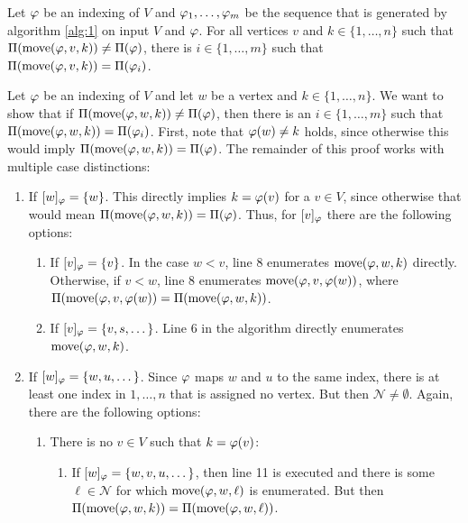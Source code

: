 \begin{lemmarep}[Completeness]
    Let $\varphi$ be an indexing of $V$ and $\varphi_1,\dots,\varphi_m$ be the sequence that is generated by algorithm \ref{alg:1} on input $V$ and $\varphi$. For all vertices $v$ and $k \in \{1,\dots,n\}$ such that $\Pi(\mathrm{move}(\varphi,v,k)) \neq \Pi(\varphi)$, there is $i\in \{1,\dots,m\}$ such that $\Pi(\mathrm{move}(\varphi,v,k)) = \Pi(\varphi_i)$.\label{lemma:completeness}
\end{lemmarep}
\begin{appendixproof}
    Let $\varphi$ be an indexing of $V$ and let $w$ be a vertex and $k\in\{1,\dots,n\}$. We want to show that if $\Pi(\mathrm{move}(\varphi,w,k)) \neq \Pi(\varphi)$, then there is an $i\in \{1,\dots,m\}$ such that $\Pi(\mathrm{move}(\varphi,w,k)) = \Pi(\varphi_i)$. First, note that $\varphi(w)\neq k$ holds, since otherwise this would imply $\Pi(\mathrm{move}(\varphi,w,k)) = \Pi(\varphi)$. The remainder of this proof works with multiple case distinctions:
    \begin{enumerate}
        \item If $[w]_\varphi = \{ w \}$. This directly implies $k = \varphi(v)$ for a $v \in V$, since otherwise that would mean $\Pi(\mathrm{move}(\varphi,w,k)) = \Pi(\varphi)$. Thus, for $[v]_\varphi$ there are the following options:
        \begin{enumerate}
            \item If $[v]_\varphi = \{ v \}$. In the case $w < v$, line 8 enumerates $\mathrm{move}(\varphi,w,k)$ directly.  Otherwise, if $v < w$, line 8 enumerates $\mathrm{move}(\varphi,v,\varphi(w))$, where $\Pi(\mathrm{move}(\varphi,v,\varphi(w)) = \Pi(\mathrm{move}(\varphi,w,k))$. 
            \item If $[v]_\varphi = \{ v,s,\dots \}$. Line 6 in the algorithm directly enumerates $\mathrm{move}(\varphi,w,k)$.
        \end{enumerate} 
        \item If $[w]_\varphi = \{ w,u, \dots \}$. Since $\varphi$ maps $w$ and $u$ to the same index, there is at least one index in $1,\dots,n$ that is assigned no vertex. But then $\mathcal{N} \neq \emptyset$. Again, there are the following options:
        \begin{enumerate}
            \item There is no $v \in V$ such that $k = \varphi(v)$: 
            \begin{enumerate}
                \item If $[w]_\varphi = \{ w,v,u,\dots \}$, then line 11 is executed and there is some $\ell \in \mathcal{N}$ for which $\mathrm{move}(\varphi,w,\ell)$ is enumerated. But then $\Pi(\mathrm{move}(\varphi,w,k))=\Pi(\mathrm{move}(\varphi,w,\ell))$.

\end{enumerate}
\end{enumerate}
\end{enumerate}
\end{appendixproof}
